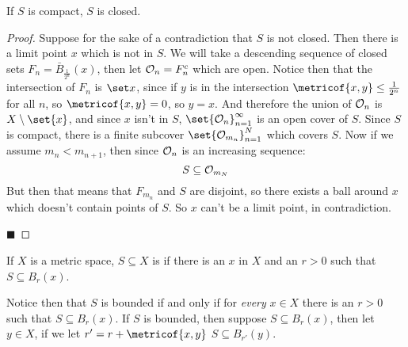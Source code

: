 \documentclass[10pt]{article}
\def\openset{{\cal O}}
\begin{document}


\bigskip


\begin{prop*}

    If $S$ is compact, $S$ is closed.

\end{prop*}

\begin{proof}

    Suppose for the sake of a contradiction that $S$ is not closed.
    Then there is a limit point $x$ which is not in $S$.
    We will take a descending sequence of closed sets $F_n = \bar B_{\frac1{2^n}}(x)$, then let $\openset_n=F_n^c$ which are open.
    Notice then that the intersection of $F_n$ is $\set x$, since if $y$ is in the intersection $\metricof{x,y}\leq\frac1{2^n}$ for all $n$, so $\metricof{x,y}=0$, so $y=x$.
    And therefore the union of $\openset_n$ is $X\setminus\set{x}$, and since $x$ isn't in $S$, $\set{\openset_n}_{n=1}^\infty$ is an open cover of $S$.
    Since $S$ is compact, there is a finite subcover $\set{\openset_{m_n}}_{n=1}^N$ which covers $S$.
    Now if we assume $m_n<m_{n+1}$, then since $\openset_n$ is an increasing sequence:
    \[ S\subseteq\openset_{m_N} \]
    But then that means that $F_{m_n}$ and $S$ are disjoint, so there exists a ball around $x$ which doesn't contain points of $S$.
    So $x$ can't be a limit point, in contradiction. \lightning

    \hfill$\blacksquare$

\end{proof}

\begin{defn*}

    If $X$ is a metric space, $S\subseteq X$ is  if there is an $x$ in $X$ and an $r>0$ such that $S\subseteq B_r(x)$.

\end{defn*}

Notice then that $S$ is bounded if and only if for \emph{every} $x\in X$ there is an $r>0$ such that $S\subseteq B_r(x)$.
If $S$ is bounded, then suppose $S\subseteq B_r(x)$, then let $y\in X$, if we let $r'=r+\metricof{x,y}$ $S\subseteq B_{r'}(y)$.
\end{document}
